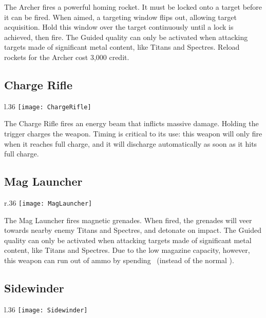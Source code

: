 The Archer fires a powerful homing rocket. It must be locked onto a target before it can be fired. When aimed, a targeting window flips out, allowing target acquisition. Hold this window over the target continuously until a lock is achieved, then fire. The Guided quality can only be activated when attacking targets made of significant metal content, like Titans and Spectres. Reload rockets for the Archer cost 3,000 credit.

\subsection{Charge Rifle}
\begin{wrapfigure}[4]{l}{.36\linewidth}
\vspace*{-2em}
\texttt{[image: ChargeRifle]}
\end{wrapfigure}

The Charge Rifle fires an energy beam that inflicts massive damage. Holding the trigger charges the weapon. Timing is critical to its use: this weapon will only fire when it reaches full charge, and it will discharge automatically as soon as it hits full charge.



\subsection{Mag Launcher}
\begin{wrapfigure}[3]{r}{.36\linewidth}
\vspace*{-2em}
\texttt{[image: MagLauncher]}
\end{wrapfigure}


The Mag Launcher fires magnetic grenades. When fired, the grenades will veer towards nearby enemy Titans and Spectres, and detonate on impact. The Guided quality can only be activated when attacking targets made of significant metal content, like Titans and Spectres. Due to the low magazine capacity, however, this weapon can run out of ammo by spending \Threat\Threat\Threat\ (instead of the normal \Despair).

\subsection{Sidewinder}
\begin{wrapfigure}[5]{l}{.36\linewidth}
\vspace*{-2em}
\texttt{[image: Sidewinder]}
\end{wrapfigure}

